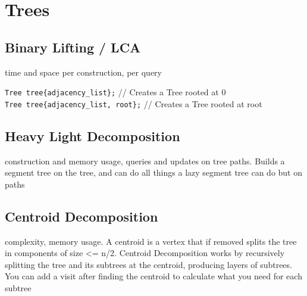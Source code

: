 \section{Trees}

\subsection{Binary Lifting / LCA}
 time and space per construction,  per query

\verb|Tree tree{adjacency_list};| // Creates a Tree rooted at 0 \\
\verb|Tree tree{adjacency_list, root};| // Creates a Tree rooted at root


\subsection{Heavy Light Decomposition}
 construction and memory usage,  queries and updates on tree paths.
Builds a segment tree on the tree, and can do all things a lazy segment tree can do but on paths


\subsection{Centroid Decomposition}
 complexity,  memory usage.
A centroid is a vertex that if removed splits the tree in components of size <= n/2.
Centroid Decomposition works by recursively splitting the tree and its subtrees
at the centroid, producing  layers of subtrees. 
You can add a visit after finding the centroid to calculate what you need for each subtree



